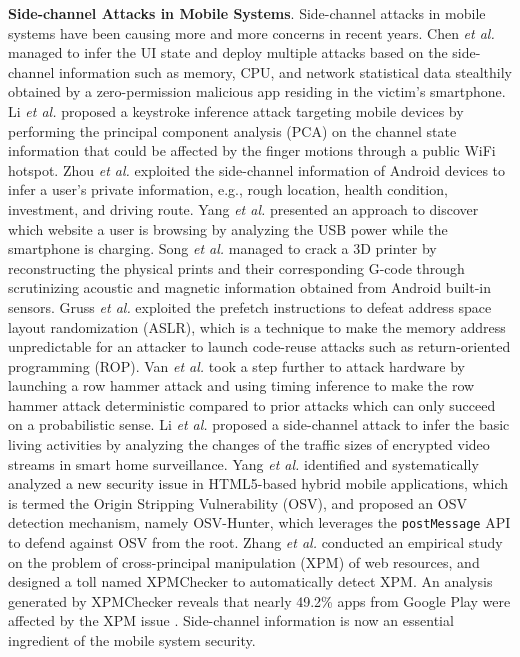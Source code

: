 \documentclass[letterpaper,12pt]{article}
\begin{document}
\noindent\textbf{Side-channel Attacks in Mobile Systems}. Side-channel attacks in mobile systems have been causing more and more concerns in recent years. Chen \emph{et al.} \cite{chen2014peeking} managed to infer the UI state and deploy multiple attacks based on the side-channel information such as memory, CPU, and network statistical data stealthily obtained by a zero-permission malicious app residing in the victim's smartphone. Li \emph{et al.} \cite{li2016csi} proposed a keystroke inference attack targeting mobile devices by performing the principal component analysis (PCA) on the channel state information that could be affected by the finger motions through a public WiFi hotspot. 
Zhou \emph{et al.} \cite{zhou2013identity} exploited the side-channel information of Android devices to infer a user's private information, e.g., rough location, health condition, investment, and driving route. Yang \emph{et al.}  \cite{yang2016inferring} presented an approach to discover which website a user is browsing by analyzing the USB power while the smartphone is charging. Song \emph{et al.} \cite{song2016my} managed to crack a 3D printer by reconstructing the physical prints and their corresponding G-code through scrutinizing acoustic and magnetic information obtained from Android built-in sensors. Gruss \emph{et al.} \cite{gruss2016prefetch} exploited the prefetch instructions to defeat address space layout randomization (ASLR), which is a technique to make the memory address unpredictable for an attacker to launch code-reuse attacks such as return-oriented programming (ROP). Van \emph{et al.} \cite{van2016drammer} took a step further to attack hardware by launching a row hammer attack and using timing inference to make the row hammer attack deterministic compared to prior attacks which can only succeed on a probabilistic sense. Li \emph{et al.} \cite{li2016side} proposed a side-channel attack to infer the basic living activities by analyzing the changes of the traffic sizes of encrypted video streams in smart home surveillance.
Yang \emph{et al.} \cite{yang2018study} identified and systematically analyzed a new security issue in HTML5-based hybrid mobile applications, which is termed the Origin Stripping Vulnerability (OSV), and proposed an OSV detection mechanism, namely OSV-Hunter, which leverages the \texttt{postMessage} API to defend against OSV from the root. 
Zhang \emph{et al.} \cite{zhang2018empirical} conducted an empirical study on the problem of cross-principal manipulation (XPM) of web resources, and designed a toll named XPMChecker to automatically detect XPM. An analysis generated by XPMChecker reveals that nearly 49.2\% apps from Google Play were affected by the XPM issue \cite{zhang2018empirical}.
Side-channel information is now an essential ingredient of the mobile system security.
\end{document}
